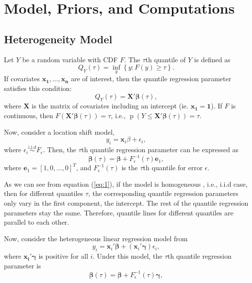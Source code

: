 \documentclass[12pt]{article}
\DeclareMathOperator{\pr}{p}
\begin{document}
\section{Model, Priors, and Computations}
\subsection{Heterogeneity Model}
Let $Y$ be a random variable with CDF $F$.  The $\tau$th quantile of
$Y$ is defined as
\begin{displaymath}
  Q_Y(\tau) = \underset{y}{\inf} \left\{ y: F(y) \ge \tau \right\}.
\end{displaymath}
If covariates $\bm{x_1, \ldots, x_n}$ are of interest, then the
quantile regression parameter satisfies this condition:
\begin{displaymath}
  Q_Y(\tau) = \bm{X'\beta}(\tau),
\end{displaymath}
where $\bm{X}$ is the matrix of covariates including an intercept
(ie. $\bm{x_1}= \bm{1}$).  If $F$ is continuous, then
$F(\bm{X'\beta}(\tau)) = \tau$, i.e., $\pr(Y \le \bm{X'\beta}(\tau)) =
\tau$.

Now, consider a location shift model,
\begin{displaymath}
  y_i = \bm{x}_i\beta + \epsilon_i,
\end{displaymath}
where $\epsilon_i \stackrel{\text{i.i.d}}{\sim} F_{\epsilon}$. Then,
the $\tau$th quantile regression parameter can be expressed as
\begin{equation}
  \label{eq:1}
  \bm{\beta}(\tau) = \bm{\beta} + F^{-1}_{\epsilon}(\tau) \bm{e}_1,
\end{equation}
where $\bm{e}_1 = [1, 0, \ldots, 0]^T$, and $F^{-1}_{\epsilon}(\tau)$
is the $\tau$th quantile for error $\epsilon$.

As we can see from equation (\ref{eq:1}), if the model is homogeneous
, i.e., i.i.d case, then for different quantiles $\tau$, the
corresponding quantile regression parameters only vary in the first
component, the intercept. The rest of the quantile regression
parameters stay the same. Therefore, quantile lines for different
quantiles are parallel to each other.

Now, consider the heterogeneous linear regression model from
\citet{he1998}
\begin{equation}\label{eq:8}
  y_i = \bm{x}_i'\bm{\beta} + (\bm{x}_i'\bm{\gamma}) \epsilon_i,
\end{equation}
where $\bm{x_i'\gamma}$ is positive for all $i$. Under this model, the
$\tau$th quantile regression parameter is
\begin{equation}\label{eq:quan}
  \bm{\beta}(\tau) = \bm{\beta} + F^{-1}_{\epsilon}(\tau) \bm{\gamma},
\end{equation}
\end{document}
